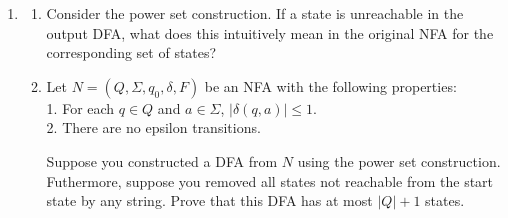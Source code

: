 \documentclass[11pt]{article}
\begin{document}
\begin{enumerate}
\begin{enumerate}
        \begin{answer}
            
        \end{answer}
        \item Describe an NFA which decides/accepts this language in $n+1$ states.

        \begin{answer}
            
        \end{answer}
        \item Describe a DFA which decides/accepts this language in $2^{n}$ states.

        \begin{answer}

        \end{answer}

        \item Prove there is no DFA of any fewer states. 

        \begin{answer}
            
        \end{answer}
        \end{enumerate}

    \item 
    \begin{enumerate}
        \item Consider the power set construction. If a state is unreachable in the output DFA, what does this intuitively mean in the original NFA for the corresponding set of states?\\
        \begin{answer}
            
        \end{answer}
        \item Let $N = (Q, \Sigma, q_0, \delta, F)$ be an NFA with the following properties:\\
        1. For each $q \in Q$ and $a \in \Sigma$, $|\delta(q,a)|\leq 1$.\\
        2. There are no epsilon transitions. 
        
        Suppose you constructed a DFA from $N$ using the power set construction. Futhermore, suppose you removed all states not reachable from the start state by any string. Prove that this DFA has at most $|Q| + 1$ states.\\
        \begin{answer}
            
        \end{answer}
    \end{enumerate}

\end{enumerate}
\end{document}
